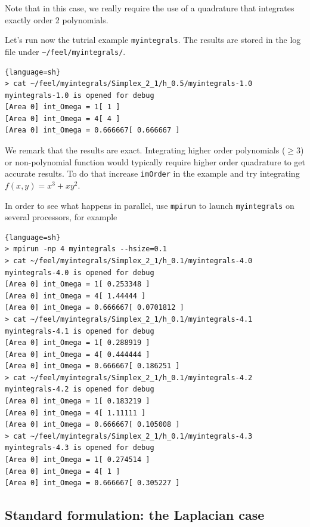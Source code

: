 \documentclass[a4paper]{book}
\begin{document}


Note that in this case, we really require the use of a quadrature that
integrates exactly order 2 polynomials.

Let's run now the tutrial example \lstinline!myintegrals!. The results are stored
in the log file under \lstinline!~/feel/myintegrals/!.

\begin{lstlisting}{language=sh}
> cat ~/feel/myintegrals/Simplex_2_1/h_0.5/myintegrals-1.0
myintegrals-1.0 is opened for debug
[Area 0] int_Omega = 1[ 1 ]
[Area 0] int_Omega = 4[ 4 ]
[Area 0] int_Omega = 0.666667[ 0.666667 ]
\end{lstlisting}

We remark that the results are exact. Integrating higher order
polynomials ($\geq 3$) or non-polynomial function would typically
require higher order quadrature to get accurate results. To do that
increase \lstinline!imOrder! in the example and try integrating
$f(x,y)=x^3 + x y^2$.


In order to see what happens in parallel, use \lstinline!mpirun! to
launch \lstinline!myintegrals! on several processors, for example

\begin{lstlisting}{language=sh}
> mpirun -np 4 myintegrals --hsize=0.1
> cat ~/feel/myintegrals/Simplex_2_1/h_0.1/myintegrals-4.0
myintegrals-4.0 is opened for debug
[Area 0] int_Omega = 1[ 0.253348 ]
[Area 0] int_Omega = 4[ 1.44444 ]
[Area 0] int_Omega = 0.666667[ 0.0701812 ]
> cat ~/feel/myintegrals/Simplex_2_1/h_0.1/myintegrals-4.1
myintegrals-4.1 is opened for debug
[Area 0] int_Omega = 1[ 0.288919 ]
[Area 0] int_Omega = 4[ 0.444444 ]
[Area 0] int_Omega = 0.666667[ 0.186251 ]
> cat ~/feel/myintegrals/Simplex_2_1/h_0.1/myintegrals-4.2
myintegrals-4.2 is opened for debug
[Area 0] int_Omega = 1[ 0.183219 ]
[Area 0] int_Omega = 4[ 1.11111 ]
[Area 0] int_Omega = 0.666667[ 0.105008 ]
> cat ~/feel/myintegrals/Simplex_2_1/h_0.1/myintegrals-4.3
myintegrals-4.3 is opened for debug
[Area 0] int_Omega = 1[ 0.274514 ]
[Area 0] int_Omega = 4[ 1 ]
[Area 0] int_Omega = 0.666667[ 0.305227 ]
\end{lstlisting}

\subsection{Standard formulation: the Laplacian case}
\label{sec:defin-bilin-forms}
\end{document}
